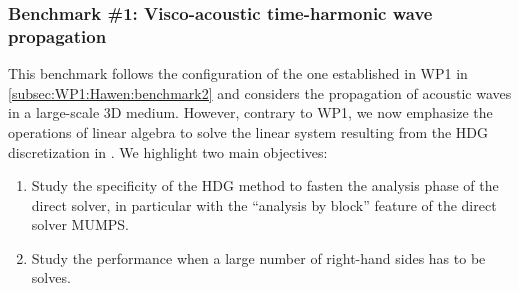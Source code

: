 %

\subsubsection{Benchmark \#1: Visco-acoustic time-harmonic wave propagation}
\label{subsec:WP3:Hawen:benchmark1}

This benchmark follows the configuration of the one 
established in WP1 in \cref{subsec:WP1:Hawen:benchmark2} and
considers the propagation of acoustic waves in a large-scale 
3D medium.
However, contrary to WP1, we now emphasize the operations 
of linear algebra to solve the linear system resulting from
the HDG discretization in \hawen. 
We highlight two main objectives: 
\begin{enumerate}
\item Study the specificity of the HDG method to fasten the 
      analysis phase of the direct solver, in particular with
      the ``analysis by block'' feature of the direct solver 
      MUMPS.
\item Study the performance when a large number of right-hand 
      sides has to be solves. 
\end{enumerate}


